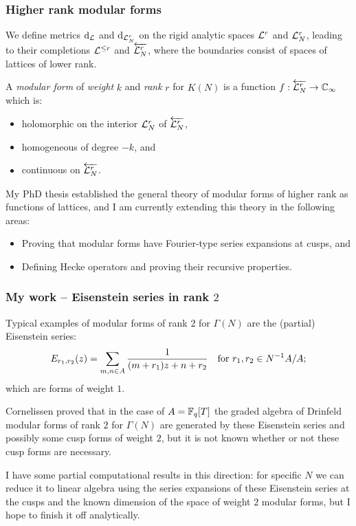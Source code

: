 \begin{frame} \frametitle{Higher rank modular forms} \pause
  We define metrics $\operatorname{d}_{\mathcal{L}}$ and $\operatorname{d}_{\mathcal{L}_N^r}$ on the rigid analytic spaces $\mathcal{L}^r$ and $\mathcal{L}_N^r$, leading to their completions $\mathcal{L}^{\leq r}$ and $\protect\overleftarrow{\mathcal{L}_{N}^{r}}$, where the boundaries consist of spaces of lattices of lower rank. \pause
  \begin{definition} \label{def:strongMForm}
    A \emph{modular form} of \emph{weight} $k$ and \emph{rank} $r$ for $K(N)$ is a function $f : \protect\overleftarrow{\mathcal{L}_{N}^{r}} \to \mathbb{C}_\infty$ which is: \pause
    \begin{itemize}
      \item holomorphic on the interior $\mathcal{L}_N^r$ of $\protect\overleftarrow{\mathcal{L}_{N}^{r}}$\pause,
      \item homogeneous of degree $-k$\pause, and
      \item continuous on $\protect\overleftarrow{\mathcal{L}_{N}^{r}}$. \pause
    \end{itemize}
  \end{definition}


  My PhD thesis established the general theory of modular forms of higher rank as functions of lattices, and I am currently extending this theory in the following areas: \pause
  \begin{itemize}
    \item Proving that modular forms have Fourier-type series expansions at cusps\pause, and
    \item Defining Hecke operators and proving their recursive properties.
  \end{itemize}
\end{frame}


\begin{frame} \frametitle{My work -- Eisenstein series in rank $2$} \pause
  Typical examples of modular forms of rank $2$ for $\Gamma(N)$ are the (partial) Eisenstein series:
  \[ E_{r_1,r_2}(z) = \sum_{m,n \in A} \frac{1}{(m+r_1)z+n+r_2} \quad\text{for}\  r_1,r_2 \in N^{-1}A/A; \]
  which are forms of weight $1$. \pause

  Cornelissen proved that in the case of $A = \mathbb{F}_q[T]$ the graded algebra of Drinfeld modular forms of rank $2$ for $\Gamma(N)$ are generated by these Eisenstein series and possibly some cusp forms of weight $2$, but it is not known whether or not these cusp forms are necessary. \pause
  
  I have some partial computational results in this direction: for specific $N$ we can reduce it to linear algebra using the series expansions of these Eisenstein series at the cusps and the known dimension of the space of weight $2$ modular forms, but I hope to finish it off analytically.
\end{frame}